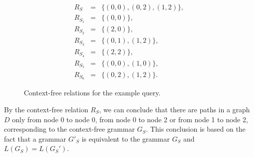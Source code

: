 \begin{figure}[h]
\begin{eqnarray*}
R_S&=&\{(0,0),(0,2),(1,2)\},\\
R_{S_1}&=&\{(0,0)\},\\
R_{S_2}&=&\{(2,0)\}, \\
R_{S_3}&=&\{(0,1), (1,2)\}, \\
R_{S_4}&=&\{(2,2)\}, \\
R_{S_5}&=&\{(0,0), (1,0)\}, \\
R_{S_6}&=&\{(0,2), (1,2)\}.
\end{eqnarray*}
\caption{Context-free relations for the example query.}
\label{ExampleQueryCFRelations}
\end{figure}

By the context-free relation $R_S$, we can conclude that there are paths in a graph $D$ only from node 0 to node 0, from node 0 to node 2 or from node 1 to node 2, corresponding to the context-free grammar $G_S$. This conclusion is based on the fact that a grammar $G'_S$ is equivalent to the grammar $G_S$ and $L(G_S) = L(G_S')$.